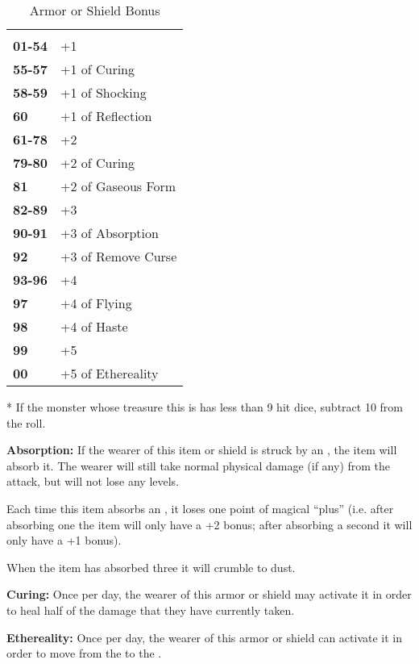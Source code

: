 \begin{multicols*}{2}
\begin {table}[H]
  \caption{Armor or Shield Bonus}
  \begin{tabularx}{\columnwidth}{>{\bfseries}YY}
	 & \\
	01-54 & +1\\
	55-57 & +1 of Curing\\
	58-59 & +1 of Shocking\\
	60 & +1 of Reflection\\
	61-78 & +2\\
	79-80 & +2 of Curing\\
	81 & +2 of Gaseous Form\\
	82-89 & +3\\
	90-91 & +3 of Absorption\\
	92 & +3 of Remove Curse\\
	93-96 & +4\\
	97 & +4 of Flying\\
	98 & +4 of Haste\\
	99 & +5\\
	00 & +5 of Ethereality\
  \end {tabularx}
* If the monster whose treasure this is has less than 9 hit dice, subtract 10 from the roll.
\end {table}

\textbf{Absorption:} If the wearer of this item or shield is struck by an , the item will absorb it. The wearer will still take normal physical damage (if any) from the attack, but will not lose any levels.

Each time this item absorbs an , it loses one point of magical “plus” (i.e. after absorbing one  the item will only have a +2 bonus; after absorbing a second it will only have a +1 bonus).

When the item has absorbed three  it will crumble to dust.

\textbf{Curing:} Once per day, the wearer of this armor or shield may activate it in order to heal half of the damage that they have currently taken.

\textbf{Ethereality:} Once per day, the wearer of this armor or shield can activate it in order to move from the  to the .


\end{multicols*}
